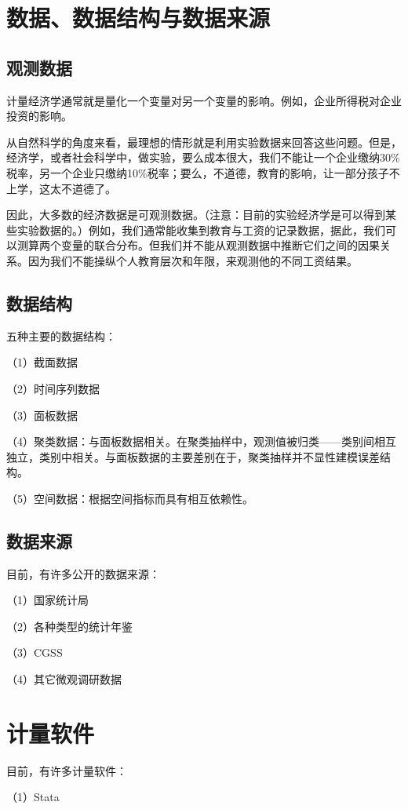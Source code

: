 \documentclass[cn,12pt,math=newtx,citestyle=gb7714-2015,bibstyle=gb7714-2015]{elegantbook}
\begin{document}
	\section{数据、数据结构与数据来源}
	\subsection{观测数据}
	\begin{flushleft}
		计量经济学通常就是量化一个变量对另一个变量的影响。例如，企业所得税对企业投资的影响。
		
		从自然科学的角度来看，最理想的情形就是利用实验数据来回答这些问题。但是，经济学，或者社会科学中，做实验，要么成本很大，我们不能让一个企业缴纳30\%税率，另一个企业只缴纳10\%税率；要么，不道德，教育的影响，让一部分孩子不上学，这太不道德了。
		
		因此，大多数的经济数据是可观测数据。（注意：目前的实验经济学是可以得到某些实验数据的。）例如，我们通常能收集到教育与工资的记录数据，据此，我们可以测算两个变量的联合分布。但我们并不能从观测数据中推断它们之间的因果关系。因为我们不能操纵个人教育层次和年限，来观测他的不同工资结果。
	\end{flushleft}
	\subsection{数据结构}
	五种主要的数据结构：
	
	（1）截面数据
	
	（2）时间序列数据
	
	（3）面板数据
	
	（4）聚类数据：与面板数据相关。在聚类抽样中，观测值被归类——类别间相互独立，类别中相关。与面板数据的主要差别在于，聚类抽样并不显性建模误差结构。
	
	（5）空间数据：根据空间指标而具有相互依赖性。
	
	\subsection{数据来源}
	目前，有许多公开的数据来源：
	
	（1）国家统计局
	
	（2）各种类型的统计年鉴
	
	（3）CGSS
	
	（4）其它微观调研数据
	\section{计量软件}
	目前，有许多计量软件：
	
	（1）Stata
	
\end{document}

